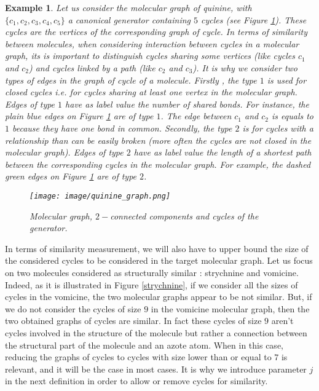 \documentclass[journal=jacsat,manuscript=article]{achemso}
\newtheorem{example}{Example}
\begin{document}
\begin{example}
\normalfont

Let us consider the molecular graph of quinine, with $\{c_1, c_2, c_3, c_4, c_5\}$ a canonical generator containing $5$ cycles (see Figure \ref{quinine}). These cycles are the vertices of the corresponding graph of cycle. In terms of similarity between molecules, when considering interaction between cycles in a molecular graph, its is important to distinguish cycles sharing some vertices (like cycles $c_1$ and $c_2$) and cycles linked by a path (like $c_2$ and $c_3$). It is why we consider two types of edges in the graph of cycle of a molecule. Firstly , the type $1$ is used for closed cycles \textit{i.e.} for cycles sharing at least one vertex in the molecular graph. Edges of type $1$ have as label value the number of shared bonds. For instance, the plain blue edges on Figure \ref{quinine} are of type $1$. The edge between $c_1$ and $c_2$ is equals to $1$ because they have one bond in common. Secondly, the type $2$ is for cycles with a relationship than can be easily broken (more often the cycles are not closed in the molecular graph). Edges of type $2$ have as label value the length of a shortest path between the corresponding cycles in the molecular graph. For example, the dashed green edges on Figure \ref{quinine} are of type $2$. 

 
\begin{figure}[H]
\texttt{[image: image/quinine\_graph.png]}
\caption{Molecular graph, $2-$connected components and cycles of the generator.}
\label{quinine}
\end{figure}
\end{example}

In terms of similarity measurement, we will also have to upper bound the size of the considered cycles to be considered in the target molecular graph. Let us focus on two molecules considered as structurally similar : strychnine and vomicine. Indeed, as it is illustrated in Figure \ref{strychnine}, if we consider all the sizes of cycles in the vomicine, the two molecular graphs appear to be not similar. But, if we do not consider the cycles of size $9$ in the vomicine molecular graph, then the two obtained graphs of cycles are similar. In fact these cycles of size $9$ aren't cycles involved in the structure of the molecule but rather a connection between the structural part of the molecule and an azote atom. When in this case, reducing the graphs of cycles to cycles with size lower than or equal to $7$ is relevant, and it will be the case in most cases. It is why we introduce parameter $j$ in the next definition in order to allow or remove cycles for similarity.
\end{document}
